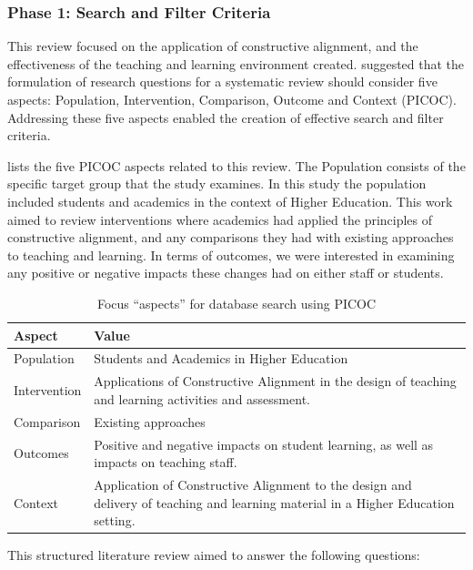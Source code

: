 \subsubsection{Phase 1: Search and Filter Criteria} %
\label{sub:review_questions}

This review focused on the application of constructive alignment, and the effectiveness of the teaching and learning environment created. \citet{Petticrew:2008} suggested that the formulation of research questions for a systematic review should consider five aspects: Population, Intervention, Comparison, Outcome and Context (PICOC). Addressing these five aspects enabled the creation of effective search and filter criteria.

 lists the five PICOC aspects related to this review. The Population consists of the specific target group that the study examines. In this study the population included students and academics in the context of Higher Education. This work aimed to review interventions where academics had applied the principles of constructive alignment, and any comparisons they had with existing approaches to teaching and learning. In terms of outcomes, we were interested in examining any positive or negative impacts these changes had on either staff or students.

\begin{table}[t]
	\renewcommand{\arraystretch}{1.2}
	\centering
	\caption{Focus ``aspects'' for database search using PICOC}
	\label{tbl:picoc}

    \begin{tabular}{l|p{9cm}}
    \textbf{Aspect} & \textbf{Value} \\
    \hline
    Population & Students and Academics in Higher Education\\
    Intervention & Applications of Constructive Alignment in the design of teaching and learning activities and assessment. \\
    Comparison & Existing approaches \\
    Outcomes & Positive and negative impacts on student learning, as well as impacts on teaching staff. \\
    Context & Application of Constructive Alignment to the design and delivery of teaching and learning material in a Higher Education setting. \\
    \end{tabular}
\end{table}


This structured literature review aimed to answer the following questions:

